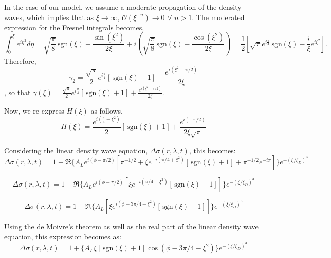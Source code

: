 \documentclass{article}
\begin{document}
In the case of our model, we assume a moderate propagation of the density waves, which implies that as $\xi \rightarrow \infty$, $\mathcal{O}(\xi^{-n}) \rightarrow 0$ $\forall$ $n>1$. The moderated expression for the Fresnel integrals becomes, 
\begin{equation}
\int_{0}^{\xi}e^{i\eta^{2}}d\eta = \sqrt{\frac{\pi}{8}}\,\text{sgn}(\xi) + \frac{\sin(\xi^2)}{2\xi} + i\left(\sqrt{\frac{\pi}{8}}\,\text{sgn}(\xi) - \frac{\cos(\xi^2)}{2\xi}\right) = \frac{1}{2}\left[\sqrt{\pi}e^{i\frac{\pi}{4}}\,\text{sgn}(\xi) - \frac{i}{\xi}e^{i\xi^{2}}\right].
\end{equation}
Therefore, 
\begin{equation}
\gamma_{2} = \frac{\sqrt{\pi}}{2}e^{i\frac{\pi}{4}}\left[\,\text{sgn}(\xi) - 1\right] + \frac{e^{i(\xi^{2} - \pi/2)}}{2\xi}
\end{equation}, so that $\gamma(\xi) = \frac{\sqrt{\pi}}{2}e^{i\frac{\pi}{4}}\left[\,\text{sgn}(\xi) + 1\right] + \frac{e^{i(\xi^{2} - \pi/2)}}{2\xi}$.

Now, we re-express  $H(\xi)$ as follows, 
\begin{equation}
    H(\xi) = \frac{e^{i(\frac{\pi}{4} - \xi^{2})}}{2}\left[\,\text{sgn}(\xi) + 1\right] + \frac{e^{i(-\pi/2)}}{2\xi \sqrt{\pi}}
\end{equation}

Considering the linear density wave equation, $\Delta \sigma(r,\lambda,t)$, this becomes:
\begin{equation}
\Delta \sigma(r,\lambda,t) = 1 + \Re\{A_{L}e^{i(\phi-\pi/2)}[\pi^{-1/2} + \xi e^{-i{(\pi/4 + \xi^{2})}}\left[\,\text{sgn}(\xi) + 1\right] + \pi^{-1/2}e^{-i\pi}]\} e^{-(\xi/\xi_{D})^{3}}
\end{equation}

\begin{equation}
\Delta \sigma(r,\lambda,t) = 1 + \Re\{A_{L}e^{i(\phi-\pi/2)}[\xi e^{-i{(\pi/4 + \xi^{2})}}\left[\,\text{sgn}(\xi) + 1\right]]\} e^{-(\xi/\xi_{D})^{3}}
\end{equation}


\begin{equation}
\Delta \sigma(r,\lambda,t) = 1 + \Re\{A_{L}[\xi e^{i{(\phi - 3\pi/4 - \xi^{2})}}\left[\,\text{sgn}(\xi) + 1\right]]\} e^{-(\xi/\xi_{D})^{3}}
\end{equation}

Using the de Moivre's theorem as well as the real part of the linear density wave equation, this expression becomes as:
\begin{equation}
\Delta \sigma(r,\lambda,t) = 1 + {\{A_{L}\xi\left[\,\text{sgn}(\xi) + 1\right]\cos{(\phi - 3\pi/4 - \xi^{2})}}\}e^{-(\xi/\xi_{D})^{3}}
\end{equation}
\end{document}

